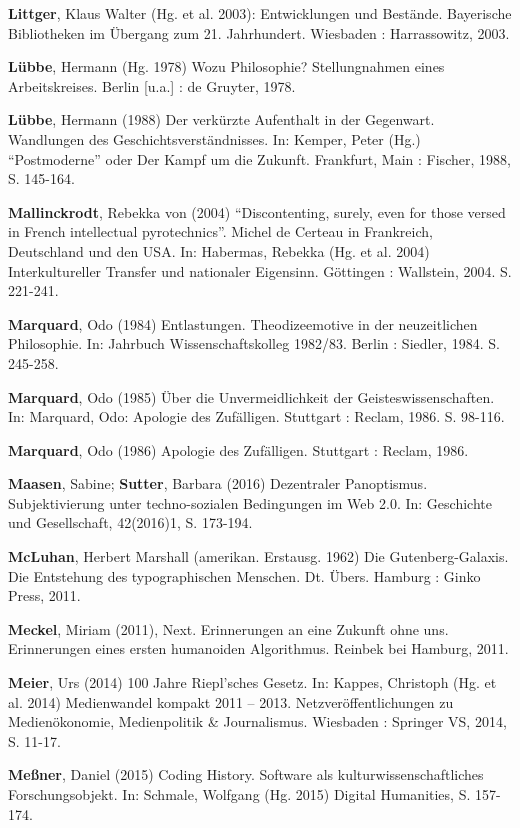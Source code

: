 \documentclass[a4paper,
fontsize=11pt,
oneside,
numbers=noperiodatend,
parskip=half-,
bibliography=totoc,
final
]{scrartcl}
\begin{document}
\textbf{Littger}, Klaus Walter (Hg. et al. 2003): Entwicklungen und
Bestände. Bayerische Bibliotheken im Übergang zum 21. Jahrhundert.
Wiesbaden : Harrassowitz, 2003.

\textbf{Lübbe}, Hermann (Hg. 1978) Wozu Philosophie? Stellungnahmen
eines Arbeitskreises. Berlin {[}u.a.{]} : de Gruyter, 1978.

\textbf{Lübbe}, Hermann (1988) Der verkürzte Aufenthalt in der
Gegenwart. Wandlungen des Geschichtsverständnisses. In: Kemper, Peter
(Hg.) \enquote{Postmoderne} oder Der Kampf um die Zukunft. Frankfurt,
Main : Fischer, 1988, S. 145-164.

\textbf{Mallinckrodt}, Rebekka von (2004) \enquote{Discontenting,
surely, even for those versed in French intellectual pyrotechnics}.
Michel de Certeau in Frankreich, Deutschland und den USA. In: Habermas,
Rebekka (Hg. et al. 2004) Interkultureller Transfer und nationaler
Eigensinn. Göttingen : Wallstein, 2004. S. 221-241.

\textbf{Marquard}, Odo (1984) Entlastungen. Theodizeemotive in der
neuzeitlichen Philosophie. In: Jahrbuch Wissenschaftskolleg 1982/83.
Berlin : Siedler, 1984. S. 245-258.

\textbf{Marquard}, Odo (1985) Über die Unvermeidlichkeit der
Geisteswissenschaften. In: Marquard, Odo: Apologie des Zufälligen.
Stuttgart : Reclam, 1986. S. 98-116.

\textbf{Marquard}, Odo (1986) Apologie des Zufälligen. Stuttgart :
Reclam, 1986.

\textbf{Maasen}, Sabine; \textbf{Sutter}, Barbara (2016) Dezentraler
Panoptismus. Subjektivierung unter techno-sozialen Bedingungen im Web
2.0. In: Geschichte und Gesellschaft, 42(2016)1, S. 173-194.

\textbf{McLuhan}, Herbert Marshall (amerikan. Erstausg. 1962) Die
Gutenberg-Galaxis. Die Entstehung des typographischen Menschen. Dt.
Übers. Hamburg : Ginko Press, 2011.

\textbf{Meckel}, Miriam (2011), Next. Erinnerungen an eine Zukunft ohne
uns. Erinnerungen eines ersten humanoiden Algorithmus. Reinbek bei
Hamburg, 2011.

\textbf{Meier}, Urs (2014) 100 Jahre Riepl'sches Gesetz. In: Kappes,
Christoph (Hg. et al. 2014) Medienwandel kompakt 2011 -- 2013.
Netzveröffentlichungen zu Medienökonomie, Medienpolitik \& Journalismus.
Wiesbaden : Springer VS, 2014, S. 11-17.

\textbf{Meßner}, Daniel (2015) Coding History. Software als
kulturwissenschaftliches Forschungsobjekt. In: Schmale, Wolfgang (Hg.
2015) Digital Humanities, S. 157-174.
\end{document}
